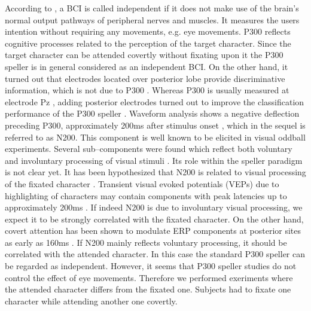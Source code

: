 \documentclass[a4paper,twocolumn]{article}
\begin{document}
According to \cite{Wolpaw2002}, a BCI is called independent if it does not make use of the brain's normal output pathways of peripheral nerves and muscles. It measures the users intention without requiring any movements, e.g. eye movements. P300 reflects cognitive processes related to the perception of the target character. Since the target character can be attended covertly without fixating upon it \cite{Posner1980} the P300 speller is in general considered as an independent BCI. On the other hand, it turned out that electrodes located over posterior lobe provide discriminative information, which is not due to P300 \cite{BlankertzCurio2003,Kaper2004}. Whereas P300 is usually measured at electrode Pz \cite{Sutton1965,Farwell1988}, adding posterior electrodes turned out to improve the classification performance of the P300 speller \cite{Kaper2004,Krusienski2008,Hoffmann2008}.
Waveform analysis shows a negative deflection preceding P300, approximately 200ms after stimulus onset \cite{Krusienski2008,Hoffmann2008,Hong2009}, which in the sequel is referred to as N200. This component is well known to be elicited in visual oddball experiments. Several sub--components were found which reflect both voluntary and involuntary processing of visual stimuli \cite{Makeig1999, PazoAlvarez2003, PatelAzzam2005}. Its role within the speller paradigm is not clear yet. It has been hypothesized that N200 is related to visual processing of the fixated character \cite{BlankertzCurio2003,Kaper2004,Krusienski2008}. Transient visual evoked potentials (VEPs) due to highlighting of characters may contain components with peak latencies up to approximately 200ms \cite{Regan1972}. If indeed N200 is due to involuntary visual processing, we expect it to be strongly correlated with the fixated character. On the other hand, covert attention has been shown to modulate ERP components at posterior sites as early as 160ms \cite{Nobre2000}. 
If N200 mainly reflects voluntary processing, it should be correlated with the attended character. In this case the standard P300 speller can be regarded as independent. However, it seems that P300 speller studies do not control the effect of eye movements. Therefore we performed exeriments where the attended character differs from the fixated one. Subjects had to fixate one character while attending another one covertly.
\end{document}
